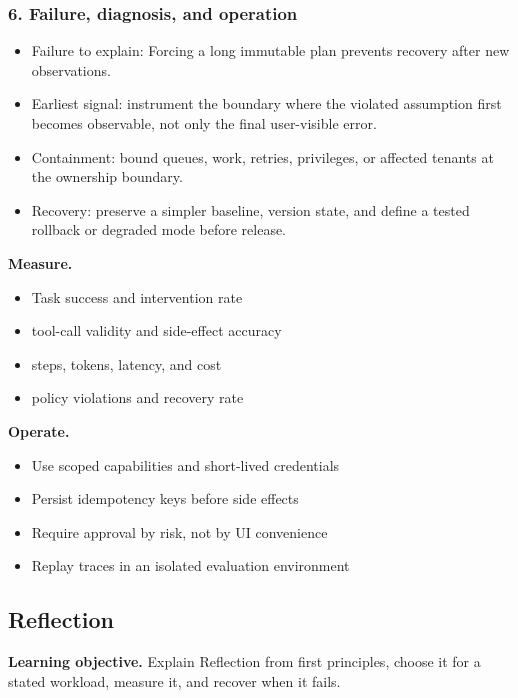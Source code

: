 \subsubsection*{6. Failure, diagnosis, and operation}
\begin{itemize}
\item Failure to explain: Forcing a long immutable plan prevents recovery after new observations.
\item Earliest signal: instrument the boundary where the violated assumption first becomes observable, not only the final user-visible error.
\item Containment: bound queues, work, retries, privileges, or affected tenants at the ownership boundary.
\item Recovery: preserve a simpler baseline, version state, and define a tested rollback or degraded mode before release.
\end{itemize}
\textbf{Measure.}\begin{itemize}
\item Task success and intervention rate
\item tool-call validity and side-effect accuracy
\item steps, tokens, latency, and cost
\item policy violations and recovery rate
\end{itemize}
\textbf{Operate.}\begin{itemize}
\item Use scoped capabilities and short-lived credentials
\item Persist idempotency keys before side effects
\item Require approval by risk, not by UI convenience
\item Replay traces in an isolated evaluation environment
\end{itemize}
\subsection{Reflection}
\textbf{Learning objective.} Explain Reflection from first principles, choose it for a stated workload, measure it, and recover when it fails.
